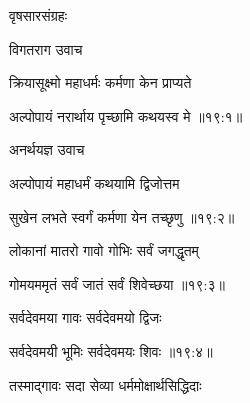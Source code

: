 \centerline{\Huge\devanagarifontbold वृषसारसंग्रहः  }

\thispagestyle{empty}

\fancyhead[LE]{}
\fancyhead[RE]{}
\fancyhead[LO]{}
\fancyhead[RO]{}
\szam\bek

\centerline{\Large\devanagarifontbold [   एकोनविंशतिमो ऽध्यायः  ]}{\vrule depth10pt width0pt} 

\vers


{\devanagarifont विगतराग उवाच {\dandab}\dontdisplaylinenum  }%
 
{\devanagarifont क्रियासूक्ष्मो महाधर्मः कर्मणा केन प्राप्यते \thinspace{\danda} \dontdisplaylinenum }%
 

{\devanagarifont अल्पोपायं नरार्थाय पृच्छामि कथयस्व मे {॥१९:१॥} \veg\dontdisplaylinenum }%
 
{\devanagarifont अनर्थयज्ञ उवाच {\dandab}\dontdisplaylinenum  }%
 
{\devanagarifont अल्पोपायं महाधर्मं कथयामि द्विजोत्तम \thinspace{\danda} \dontdisplaylinenum }%


{\devanagarifont सुखेन लभते स्वर्गं कर्मणा येन तच्छृणु {॥१९:२॥} \veg\dontdisplaylinenum }%
 
{\devanagarifont लोकानां मातरो गावो गोभिः सर्वं जगद्धृतम् \thinspace{\dandab} \dontdisplaylinenum }%
 

{\devanagarifont गोमयममृतं सर्वं जातं सर्वं शिवेच्छया {॥१९:३॥} \veg\dontdisplaylinenum }%

{\devanagarifont सर्वदेवमया गावः सर्वदेवमयो द्विजः \thinspace{\dandab} \dontdisplaylinenum }%


{\devanagarifont सर्वदेवमयी भूमिः सर्वदेवमयः शिवः {॥१९:४॥} \veg\dontdisplaylinenum }%

{\devanagarifont तस्माद्गावः सदा सेव्या धर्ममोक्षार्थसिद्धिदाः \thinspace{\dandab} \dontdisplaylinenum }%

